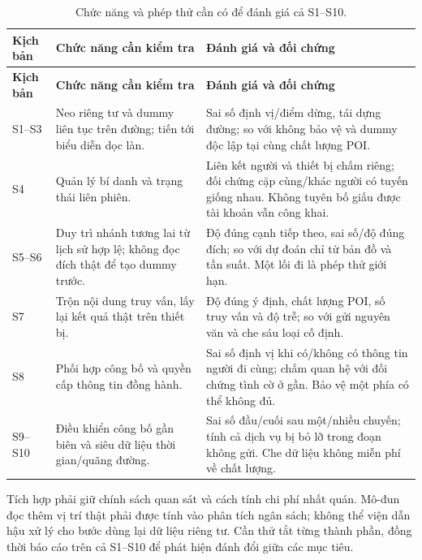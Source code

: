 \begingroup\small{}
\begin{longtable}{P{1.5cm}P{5.3cm}P{6.2cm}}
\caption{Chức năng và phép thử cần có để đánh giá cả S1--S10.}\\
\toprule\textbf{Kịch bản} & \textbf{Chức năng cần kiểm tra} & \textbf{Đánh giá và đối chứng}\\\midrule\endfirsthead
\toprule\textbf{Kịch bản} & \textbf{Chức năng cần kiểm tra} & \textbf{Đánh giá và đối chứng}\\\midrule\endhead
\bottomrule\endfoot
S1--S3 & Neo riêng tư và dummy liên tục trên đường; tiến tới biểu diễn dọc làn. & Sai số định vị/điểm dừng, tái dựng đường; so với không bảo vệ và dummy độc lập tại cùng chất lượng POI.\\\midrule
S4 & Quản lý bí danh và trạng thái liên phiên. & Liên kết người và thiết bị chấm riêng; đối chứng cặp cùng/khác người có tuyến giống nhau. Không tuyên bố giấu được tài khoản vẫn công khai.\\\midrule
S5--S6 & Duy trì nhánh tương lai từ lịch sử hợp lệ; không đọc đích thật để tạo dummy trước. & Độ đúng cạnh tiếp theo, sai số/độ đúng đích; so với dự đoán chỉ từ bản đồ và tần suất. Một lối đi là phép thử giới hạn.\\\midrule
S7 & Trộn nội dung truy vấn, lấy lại kết quả thật trên thiết bị. & Độ đúng ý định, chất lượng POI, số truy vấn và độ trễ; so với gửi nguyên văn và che sáu loại cố định.\\\midrule
S8 & Phối hợp công bố và quyền cấp thông tin đồng hành. & Sai số định vị khi có/không có thông tin người đi cùng; chấm quan hệ với đối chứng tình cờ ở gần. Bảo vệ một phía có thể không đủ.\\\midrule
S9--S10 & Điều khiển công bố gần biên và siêu dữ liệu thời gian/quãng đường. & Sai số đầu/cuối sau một/nhiều chuyến; tính cả dịch vụ bị bỏ lỡ trong đoạn không gửi. Che dữ liệu không miễn phí về chất lượng.\\
\end{longtable}
\endgroup

Tích hợp phải giữ chính sách quan sát và cách tính chi phí nhất quán. Mô-đun đọc thêm vị trí thật phải được tính vào phân tích ngân sách; không thể viện dẫn hậu xử lý cho bước dùng lại dữ liệu riêng tư. Cần thử tắt từng thành phần, đồng thời báo cáo trên cả S1--S10 để phát hiện đánh đổi giữa các mục tiêu.
